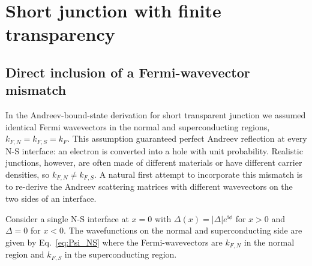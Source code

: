 \documentclass[11pt,a4paper,twoside,openany]{report}
\begin{document}
\section{Short junction with finite transparency}
\label{sec:Beenakker}
\subsection{Direct inclusion of a Fermi-wavevector mismatch}

In the Andreev-bound-state derivation for short transparent junction we assumed identical Fermi wavevectors in the normal and superconducting regions, $k_{F,N}=k_{F,S}=k_F$. This assumption guaranteed perfect Andreev reflection at every N-S interface: an electron is converted into a hole with unit probability. Realistic junctions, however, are often made of different materials or have different carrier densities, so $k_{F,N}\neq k_{F,S}$. A natural first attempt to
incorporate this mismatch is to re-derive the Andreev scattering matrices with different wavevectors on the two sides of an interface.

Consider a single N-S interface at $x=0$ with $\Delta(x)=|\Delta|e^{\mathrm{i}\phi}$ for $x>0$ and
$\Delta=0$ for $x<0$. The wavefunctions on the normal and superconducting side are given by Eq.~\eqref{eq:Psi_NS} where the Fermi-wavevectors are $k_{F,N}$ in the normal region and $k_{F,S}$ in the superconducting region.
\end{document}
